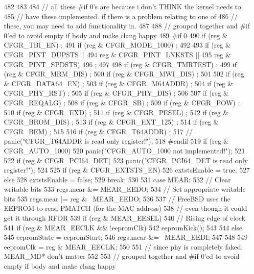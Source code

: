 \begin{DoxyCode}
{{{{482             }
483 
484 // all these #if 0's are because i don't THINK the kernel needs to
485 // have these implemented. if there is a problem relating to one of
486 // these, you may need to add functionality in.
487 
488 // grouped together and #if 0'ed to avoid empty if body and make clang happy
489 #if 0
490             if (reg & CFGR_TBI_EN) ;
491             if (reg & CFGR_MODE_1000) ;
492 
493             if (reg & CFGR_PINT_DUPSTS ||
494                 reg & CFGR_PINT_LNKSTS ||
495                 reg & CFGR_PINT_SPDSTS)
496                 ;
497 
498             if (reg & CFGR_TMRTEST) ;
499             if (reg & CFGR_MRM_DIS) ;
500             if (reg & CFGR_MWI_DIS) ;
501 
502             if (reg & CFGR_DATA64_EN) ;
503             if (reg & CFGR_M64ADDR) ;
504             if (reg & CFGR_PHY_RST) ;
505             if (reg & CFGR_PHY_DIS) ;
506 
507             if (reg & CFGR_REQALG) ;
508             if (reg & CFGR_SB) ;
509             if (reg & CFGR_POW) ;
510             if (reg & CFGR_EXD) ;
511             if (reg & CFGR_PESEL) ;
512             if (reg & CFGR_BROM_DIS) ;
513             if (reg & CFGR_EXT_125) ;
514             if (reg & CFGR_BEM) ;
515 
516             if (reg & CFGR_T64ADDR) ;
517             // panic("CFGR_T64ADDR is read only register!\n");
518 #endif
519             if (reg & CFGR_AUTO_1000)
520                 panic("CFGR_AUTO_1000 not implemented!\n");
521 
522             if (reg & CFGR_PCI64_DET)
523                 panic("CFGR_PCI64_DET is read only register!\n");
524 
525             if (reg & CFGR_EXTSTS_EN)
526                 extstsEnable = true;
527             else
528                 extstsEnable = false;
529             break;
530 
531           case MEAR:
532             // Clear writable bits
533             regs.mear &= MEAR_EEDO;
534             // Set appropriate writable bits
535             regs.mear |= reg & ~MEAR_EEDO;
536 
537             // FreeBSD uses the EEPROM to read PMATCH (for the MAC address)
538             // even though it could get it through RFDR
539             if (reg & MEAR_EESEL) {
540                 // Rising edge of clock
541                 if (reg & MEAR_EECLK && !eepromClk)
542                     eepromKick();
543             }
544             else {
545                 eepromState = eepromStart;
546                 regs.mear &= ~MEAR_EEDI;
547             }
548 
549             eepromClk = reg & MEAR_EECLK;
550 
551             // since phy is completely faked, MEAR_MD* don't matter
552 
553 // grouped together and #if 0'ed to avoid empty if body and make clang happy
}}}
\end{DoxyCode}
